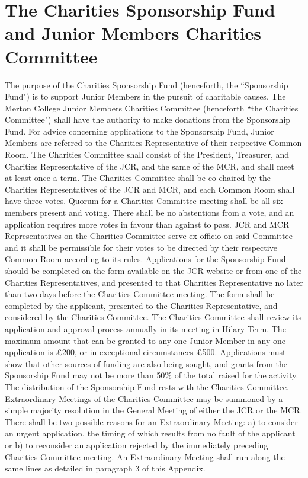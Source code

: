 \chapter{The Charities Sponsorship Fund and Junior Members Charities Committee}
\appnpara The purpose of the Charities Sponsorship Fund (henceforth, the ``Sponsorship Fund") is to support Junior Members in the pursuit of charitable causes.
\appnpara The Merton College Junior Members Charities Committee (henceforth ``the Charities Committee") shall have the authority to make donations from the Sponsorship Fund. For advice concerning applications to the Sponsorship Fund, Junior Members are referred to the Charities Representative of their respective Common Room.
\appnpara The Charities Committee shall consist of the President, Treasurer, and Charities Representative of the JCR, and the same of the MCR, and shall meet at least once a term. The Charities Committee shall be co-chaired by the Charities Representatives of the JCR and MCR, and each Common Room shall have three votes. Quorum for a Charities Committee meeting shall be all six members present and voting. There shall be no abstentions from a vote, and an application requires more votes in favour than against to pass. JCR and MCR Representatives on the Charities Committee serve ex officio on said Committee and it shall be permissible for their votes to be directed by their respective Common Room according to its rules.
\appnpara Applications for the Sponsorship Fund should be completed on the form available on the JCR website or from one of the Charities Representatives, and presented to that Charities Representative no later than two days before the Charities Committee meeting. The form shall be completed by the applicant, presented to the Charities Representative, and considered by the Charities Committee. The Charities Committee shall review its application and approval process annually in its meeting in Hilary Term.
\appnpara The maximum amount that can be granted to any one Junior Member in any one application is £200, or in exceptional circumstances £500. Applications must show that other sources of funding are also being sought, and grants from the Sponsorship Fund may not be more than 50\% of the total raised for the activity. The distribution of the Sponsorship Fund rests with the Charities Committee.
\appnpara Extraordinary Meetings of the Charities Committee may be summoned by a simple majority resolution in the General Meeting of either the JCR or the MCR. There shall be two possible reasons for an Extraordinary Meeting: a) to consider an urgent application, the timing of which results from no fault of the applicant or b) to reconsider an application rejected by the immediately preceding Charities Committee meeting. An Extraordinary Meeting shall run along the same lines as detailed in paragraph 3 of this Appendix.
